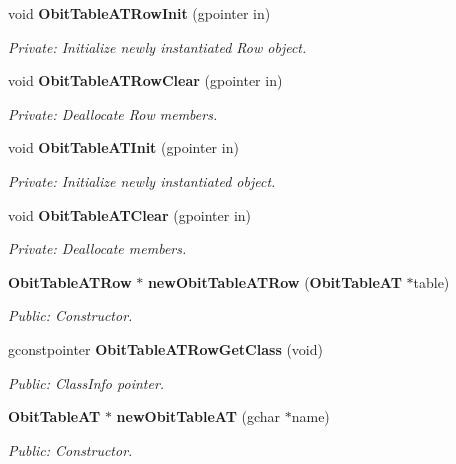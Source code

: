 \begin{CompactItemize}
\item 
void {\bf Obit\-Table\-ATRow\-Init} (gpointer in)
\begin{CompactList}\small\item\em Private: Initialize newly instantiated Row object. \item\end{CompactList}\item 
void {\bf Obit\-Table\-ATRow\-Clear} (gpointer in)
\begin{CompactList}\small\item\em Private: Deallocate Row members. \item\end{CompactList}\item 
void {\bf Obit\-Table\-ATInit} (gpointer in)
\begin{CompactList}\small\item\em Private: Initialize newly instantiated object. \item\end{CompactList}\item 
void {\bf Obit\-Table\-ATClear} (gpointer in)
\begin{CompactList}\small\item\em Private: Deallocate members. \item\end{CompactList}\item 
{\bf Obit\-Table\-ATRow} $\ast$ {\bf new\-Obit\-Table\-ATRow} ({\bf Obit\-Table\-AT} $\ast$table)
\begin{CompactList}\small\item\em Public: Constructor. \item\end{CompactList}\item 
gconstpointer {\bf Obit\-Table\-ATRow\-Get\-Class} (void)
\begin{CompactList}\small\item\em Public: Class\-Info pointer. \item\end{CompactList}\item 
{\bf Obit\-Table\-AT} $\ast$ {\bf new\-Obit\-Table\-AT} (gchar $\ast$name)
\begin{CompactList}\small\item\em Public: Constructor. \item\end{CompactList}\item 

\end{CompactItemize}
